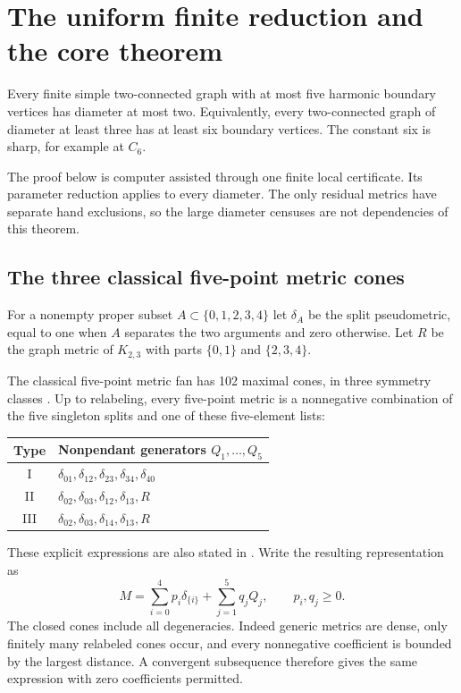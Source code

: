\section{The uniform finite reduction and the core theorem}\label{sec:capping}
\begin{theorem}\label{thm:unrestricted}
Every finite simple two-connected graph with at most five harmonic
boundary vertices has diameter at most two. Equivalently, every
two-connected graph of diameter at least three has at least six boundary
vertices. The constant six is sharp, for example at $C_6$.
\end{theorem}
The proof below is computer assisted through one finite local certificate.
Its parameter reduction applies to every diameter. The only residual
metrics have separate hand exclusions, so the large diameter censuses
are not dependencies of this theorem.

\subsection{The three classical five-point metric cones}
For a nonempty proper subset $A\subset\{0,1,2,3,4\}$ let $\delta_A$
be the split pseudometric, equal to one when $A$ separates the two
arguments and zero otherwise. Let $R$ be the graph metric of $K_{2,3}$
with parts $\{0,1\}$ and $\{2,3,4\}$.

The classical five-point metric fan has 102 maximal cones, in three
symmetry classes \cite[Section 2]{koolen}. Up to relabeling, every
five-point metric is a nonnegative combination of the five singleton
splits and one of these five-element lists:
\begin{center}
\begin{tabular}{@{}cl@{}}\toprule
Type & Nonpendant generators $Q_1,\ldots,Q_5$\\\midrule
I & $\delta_{01},\delta_{12},\delta_{23},\delta_{34},\delta_{40}$\\
II & $\delta_{02},\delta_{03},\delta_{12},\delta_{13},R$\\
III & $\delta_{02},\delta_{03},\delta_{14},\delta_{13},R$\\\bottomrule
\end{tabular}
\end{center}
These explicit expressions are also stated in \cite[p.~186]{celik}.
Write the resulting representation as
\begin{equation}\label{eq:cone}
 M=\sum_{i=0}^4 p_i\delta_{\{i\}}+\sum_{j=1}^5 q_jQ_j,
 \qquad p_i,q_j\ge0.
\end{equation}
The closed cones include all degeneracies. Indeed generic metrics are
dense, only finitely many relabeled cones occur, and every nonnegative
coefficient is bounded by the largest distance. A convergent subsequence
therefore gives the same expression with zero coefficients permitted.

